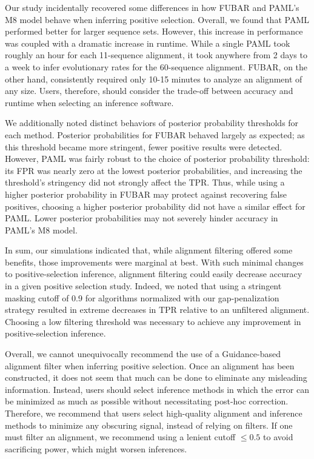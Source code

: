 \documentclass[10pt]{article}
\begin{document}
Our study incidentally recovered some differences in how FUBAR and PAML's M8 model behave when inferring positive selection. Overall, we found that PAML performed better for larger sequence sets. However, this increase in performance was coupled with a dramatic increase in runtime. While a single PAML took roughly an hour for each 11-sequence alignment, it took anywhere from 2 days to a week to infer evolutionary rates for the 60-sequence alignment. FUBAR, on the other hand, consistently required only 10-15 minutes to analyze an alignment of any size. Users, therefore, should consider the trade-off between accuracy and runtime when selecting an inference software. 

We additionally noted distinct behaviors of posterior probability thresholds for each method. Posterior probabilities for FUBAR behaved largely as expected; as this threshold became more stringent, fewer positive results were detected. However, PAML was fairly robust to the choice of posterior probability threshold: its FPR was nearly zero at the lowest posterior probabilities, and increasing the threshold's stringency did not strongly affect the TPR. Thus, while using a higher posterior probability in FUBAR may protect against recovering false positives, choosing a higher posterior probability did not have a similar effect for PAML. Lower posterior probabilities may not severely hinder accuracy in PAML's M8 model.
 
In sum, our simulations indicated that, while alignment filtering offered some benefits, those improvements were marginal at best. With such minimal changes to positive-selection inference, alignment filtering could easily decrease accuracy in a given positive selection study. Indeed, we noted that using a stringent masking cutoff of 0.9 for algorithms normalized with our gap-penalization strategy resulted in extreme decreases in TPR relative to an unfiltered alignment. Choosing a low filtering threshold was necessary to achieve any improvement in positive-selection inference.  

Overall, we cannot unequivocally recommend the use of a Guidance-based alignment filter when inferring positive selection. Once an alignment has been constructed, it does not seem that much can be done to eliminate any misleading information. Instead, users should select inference methods in which the error can be minimized as much as possible without necessitating post-hoc correction. Therefore, we recommend that users select high-quality alignment and inference methods to minimize any obscuring signal, instead of relying on filters. If one must filter an alignment, we recommend using a lenient cutoff $\leq0.5$ to avoid sacrificing power, which might worsen inferences.
\end{document}
